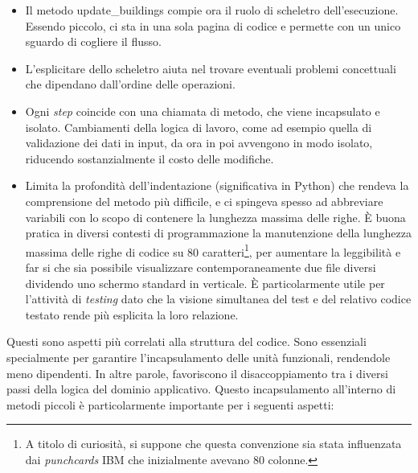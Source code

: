 \documentclass[12pt]{report}
\begin{document}
\begin{itemize}
  \item Il metodo update\_buildings compie ora il ruolo
  di scheletro dell'esecuzione. Essendo piccolo, ci sta in una sola
  pagina di codice e permette con un unico sguardo di cogliere il flusso.
  \item L'esplicitare dello scheletro aiuta nel trovare
   eventuali problemi concettuali che dipendano dall'ordine
   delle operazioni.
  \item Ogni \textit{step} coincide con una chiamata di metodo, 
  che viene incapsulato e isolato. Cambiamenti della logica di
  lavoro, come ad esempio quella di validazione dei dati in input,
  da ora in poi avvengono in modo isolato, riducendo
  sostanzialmente il costo delle modifiche.
  \item Limita la profondità dell'indentazione (significativa in Python) 
  che rendeva la comprensione del metodo più difficile, e ci spingeva spesso
  ad abbreviare variabili con lo scopo di contenere la lunghezza massima
  delle righe. 
  È buona pratica in diversi contesti di programmazione 
  la manutenzione della lunghezza massima delle righe di codice su 
  80 caratteri\footnote{
  A titolo di curiosità, si suppone che questa convenzione sia stata 
  influenzata dai \textit{punchcards} IBM che inizialmente avevano 80 colonne.
  }, 
  per aumentare la leggibilità e far si che sia possibile visualizzare
  contemporaneamente due file diversi dividendo uno schermo standard
  in verticale. È particolarmente utile per l'attività di \textit{testing} 
  dato che la visione simultanea del test e del relativo codice testato
  rende più esplicita la loro relazione.  
\end{itemize}

Questi sono aspetti più correlati alla struttura del codice. Sono essenziali
specialmente per garantire l'incapsulamento delle unità funzionali, rendendole
meno dipendenti. In altre parole, favoriscono il disaccoppiamento tra i diversi
passi della logica del dominio applicativo. Questo incapsulamento all'interno
di metodi piccoli è particolarmente importante per i seguenti aspetti:
\end{document}
